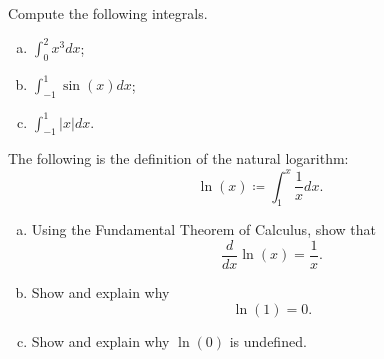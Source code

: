     \begin{problem}
    Compute the following integrals.
    \begin{enumerate}[(a)]
        \item $\displaystyle{\int_0^2 x^3 dx}$;
        \item $\displaystyle{\int_{-1}^1 \sin(x)dx}$;
        \item $\displaystyle{\int_{-1}^1 |x|dx}$.
    \end{enumerate}
    \end{problem}

    \begin{problem*}
    The following is the definition of the natural logarithm:
    \[
    \ln(x)\coloneqq\int_1^x \frac{1}{x}dx.
    \]
    \begin{enumerate}[(a)]
        \item Using the Fundamental Theorem of Calculus, show that
        \[
        \frac{d}{dx}\ln(x)=\frac{1}{x}.
        \]
        \item Show and explain why
        \[
        \ln(1)=0.
        \]
        \item Show and explain why $\ln(0)$ is undefined.
    \end{enumerate}
    \end{problem*}







